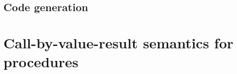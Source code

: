 \documentclass{article}
\begin{document}
\subsection{Code generation}

\section{Call-by-value-result semantics for procedures}

\end{document}
